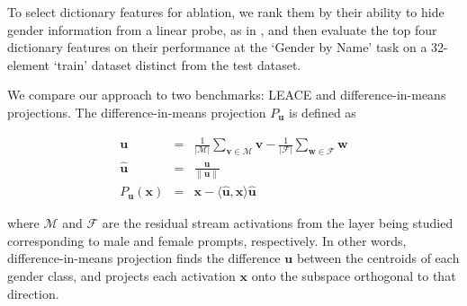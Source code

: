 To select dictionary features for ablation, we rank them by their ability to hide gender information from a linear probe, as in \citet{ravfogel2022linear}, and then evaluate the top four dictionary features on their performance at the `Gender by Name' task on a 32-element `train' dataset distinct from the test dataset.

We compare our approach to two benchmarks: LEACE \citep{belrose2023leace} and difference-in-means projections.
The difference-in-means projection $P_\mathbf{u}$ is defined as



\begin{eqnarray*}
    \mathbf{u} &=& \frac{1}{|\mathcal M|}\sum_{\mathbf{v} \in  \mathcal M}\mathbf{v} - \frac{1}{|\mathcal F|}\sum_{\mathbf{w}\in \mathcal F}\mathbf{w}  \\
    \hat{\mathbf{u}} &=& \frac{\mathbf{u}}{\|\mathbf{u}\|} \\
    P_{\mathbf{u}}(\mathbf{x}) &=& \mathbf{x} - \langle \hat{\mathbf{u}}, \mathbf{x}\rangle \hat{\mathbf{u}}
\end{eqnarray*}


where $\mathcal M$ and $\mathcal F$ are the residual stream activations from the layer being studied corresponding to male and female prompts, respectively. In other words, difference-in-means projection finds the difference $\mathbf{u}$ between the centroids of each gender class, and projects each activation $\mathbf x$ onto the subspace orthogonal to that direction.

